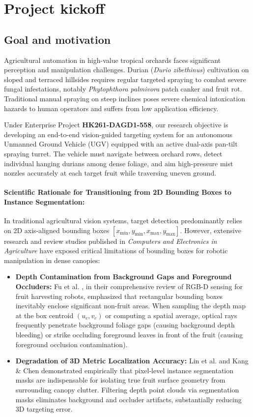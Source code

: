 \documentclass[12pt,a4paper]{article}
\begin{document}
\section{Project kickoff}

\subsection{Goal and motivation}
Agricultural automation in high-value tropical orchards faces significant perception and manipulation challenges. Durian (\textit{Durio zibethinus}) cultivation on sloped and terraced hillsides requires regular targeted spraying to combat severe fungal infestations, notably \textit{Phytophthora palmivora} patch canker and fruit rot. Traditional manual spraying on steep inclines poses severe chemical intoxication hazards to human operators and suffers from low application efficiency.

Under Enterprise Project \textbf{HK261-DAGD1-558}, our research objective is developing an end-to-end vision-guided targeting system for an autonomous Unmanned Ground Vehicle (UGV) equipped with an active dual-axis pan-tilt spraying turret. The vehicle must navigate between orchard rows, detect individual hanging durians among dense foliage, and aim high-pressure mist nozzles accurately at each target fruit while traversing uneven ground.

\paragraph{Scientific Rationale for Transitioning from 2D Bounding Boxes to Instance Segmentation:}
In traditional agricultural vision systems, target detection predominantly relies on 2D axis-aligned bounding boxes $[x_{\min}, y_{\min}, x_{\max}, y_{\max}]$. However, extensive research and review studies published in \textit{Computers and Electronics in Agriculture} have exposed critical limitations of bounding boxes for robotic manipulation in dense canopies:
\begin{itemize}
    \item \textbf{Depth Contamination from Background Gaps and Foreground Occluders:} Fu et al. \cite{fu2020rgbd}, in their comprehensive review of RGB-D sensing for fruit harvesting robots, emphasized that rectangular bounding boxes inevitably enclose significant non-fruit areas. When sampling the depth map at the box centroid $(u_c, v_c)$ or computing a spatial average, optical rays frequently penetrate background foliage gaps (causing background depth bleeding) or strike occluding foreground leaves in front of the fruit (causing foreground occlusion contamination).
    \item \textbf{Degradation of 3D Metric Localization Accuracy:} Lin et al. \cite{lin2021fruit} and Kang \& Chen \cite{kang2020dasnet} demonstrated empirically that pixel-level instance segmentation masks are indispensable for isolating true fruit surface geometry from surrounding canopy clutter. Filtering depth point clouds via segmentation masks eliminates background and occluder artifacts, substantially reducing 3D targeting error.
\end{itemize}
\end{document}

